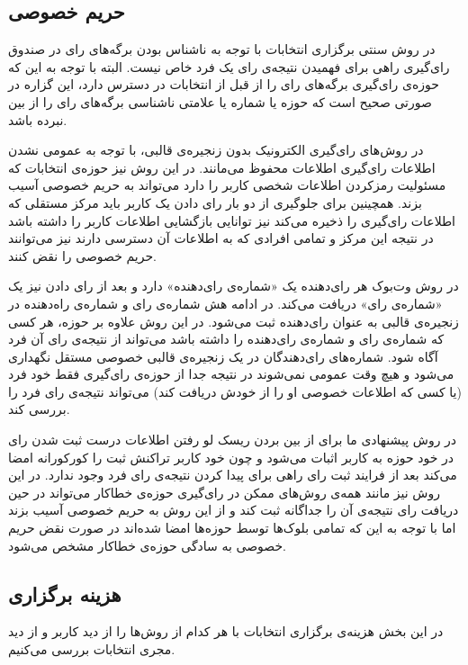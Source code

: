 \subsection{حریم خصوصی}
در روش سنتی برگزاری انتخابات با توجه به ناشناس بودن برگه‌های رای در صندوق رای‌گیری راهی برای فهمیدن نتیجه‌ی رای‌ یک فرد خاص نیست. البته با توجه به این که حوزه‌ی رای‌گیری برگه‌های رای را از قبل از انتخابات در دسترس دارد، این گزاره در صورتی صحیح است که حوزه یا شماره یا علامتی ناشناسی برگه‌های رای را از بین نبرده باشد.
\par 
در روش‌های رای‌گیری الکترونیک بدون زنجیره‌ی قالبی، با توجه به عمومی نشدن اطلاعات رای‌گیری اطلاعات محفوظ می‌مانند. در این روش نیز حوزه‌ی انتخابات که مسئولیت رمزکردن اطلاعات شخصی کاربر را دارد می‌تواند به حریم خصوصی آسیب بزند. همچینین برای جلوگیری از دو بار رای دادن یک کاربر باید مرکز مستقلی که اطلاعات رای‌گیری را ذخیره می‌کند نیز توانایی بازگشایی اطلاعات کاربر را داشته باشد در نتیجه این مرکز و تمامی افرادی که به اطلاعات آن دسترسی دارند نیز می‌توانند حریم خصوصی را نقض کنند. 
\par
در روش وت‌بوک هر رای‌دهنده یک «شماره‌ی رای‌دهنده» دارد و بعد از رای دادن نیز یک «شماره‌ی رای» دریافت می‌کند. در ادامه هش شماره‌ی رای و شماره‌ی راه‌دهنده در زنجیره‌ی قالبی به عنوان رای‌دهنده ثبت می‌شود. در این روش علاوه بر حوزه، هر کسی که شماره‌ی رای و شماره‌ی رای‌دهنده را داشته باشد می‌تواند از نتیجه‌ی رای آن فرد آگاه شود. شماره‌های رای‌دهندگان در یک زنجیره‌ی قالبی خصوصی مستقل نگهداری می‌شود و هیچ وقت عمومی نمی‌شوند در نتیجه جدا از حوزه‌ی رای‌گیری فقط خود فرد (یا کسی که اطلاعات خصوصی او را از خودش دریافت کند) می‌تواند نتیجه‌ی رای فرد را بررسی کند. 
\par 
در روش پیشنهادی ما برای از بین بردن ریسک لو رفتن اطلاعات درست ثبت شدن رای در خود حوزه به کاربر اثبات می‌شود و چون خود کاربر تراکنش ثبت را کورکورانه امضا می‌کند بعد از فرایند ثبت رای راهی برای پیدا کردن نتیجه‌ی رای فرد وجود ندارد. در این روش نیز مانند همه‌ی روش‌های ممکن در رای‌گیری حوزه‌ی خطاکار می‌تواند در حین دریافت رای نتیجه‌ی آن را جداگانه ثبت کند و از این روش به حریم خصوصی آسیب بزند اما با توجه به این که تمامی بلوک‌ها توسط حوزه‌ها امضا شده‌اند در صورت نقض حریم خصوصی به سادگی حوزه‌ی خطاکار مشخص می‌شود.

\subsection{هزینه برگزاری}
در این بخش هزینه‌ی برگزاری انتخابات با هر کدام از روش‌ها را از دید کاربر و از دید مجری انتخابات بررسی می‌کنیم.
